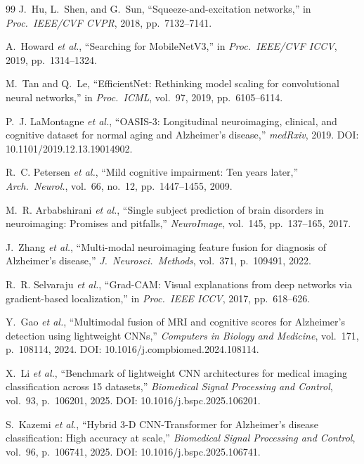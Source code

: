 \documentclass[conference]{IEEEtran}
\begin{document}
\begin{thebibliography}{99}
J.~Hu, L.~Shen, and G.~Sun,
``Squeeze-and-excitation networks,''
in \textit{Proc.\ IEEE/CVF CVPR}, 2018, pp.~7132--7141.

A.~Howard \textit{et al.},
``Searching for MobileNetV3,''
in \textit{Proc.\ IEEE/CVF ICCV}, 2019, pp.~1314--1324.

M.~Tan and Q.~Le,
``EfficientNet: Rethinking model scaling for convolutional neural
networks,''
in \textit{Proc.\ ICML}, vol.~97, 2019, pp.~6105--6114.

P.~J. LaMontagne \textit{et al.},
``OASIS-3: Longitudinal neuroimaging, clinical, and cognitive dataset
for normal aging and Alzheimer's disease,''
\textit{medRxiv}, 2019.
DOI: 10.1101/2019.12.13.19014902.

R.~C. Petersen \textit{et al.},
``Mild cognitive impairment: Ten years later,''
\textit{Arch.\ Neurol.}, vol.~66, no.~12, pp.~1447--1455, 2009.

M.~R. Arbabshirani \textit{et al.},
``Single subject prediction of brain disorders in neuroimaging: Promises
and pitfalls,''
\textit{NeuroImage}, vol.~145, pp.~137--165, 2017.

J.~Zhang \textit{et al.},
``Multi-modal neuroimaging feature fusion for diagnosis of Alzheimer's
disease,''
\textit{J.\ Neurosci.\ Methods}, vol.~371, p.~109491, 2022.

R.~R. Selvaraju \textit{et al.},
``Grad-CAM: Visual explanations from deep networks via gradient-based
localization,''
in \textit{Proc.\ IEEE ICCV}, 2017, pp.~618--626.


Y.~Gao \textit{et al.},
``Multimodal fusion of MRI and cognitive scores for Alzheimer's
detection using lightweight CNNs,''
\textit{Computers in Biology and Medicine}, vol.~171,
p.~108114, 2024.
DOI: 10.1016/j.compbiomed.2024.108114.

X.~Li \textit{et al.},
``Benchmark of lightweight CNN architectures for medical imaging
classification across 15 datasets,''
\textit{Biomedical Signal Processing and Control}, vol.~93,
p.~106201, 2025.
DOI: 10.1016/j.bspc.2025.106201.

S.~Kazemi \textit{et al.},
``Hybrid 3-D CNN-Transformer for Alzheimer's disease classification:
High accuracy at scale,''
\textit{Biomedical Signal Processing and Control}, vol.~96,
p.~106741, 2025.
DOI: 10.1016/j.bspc.2025.106741.


\end{thebibliography}
\end{document}
